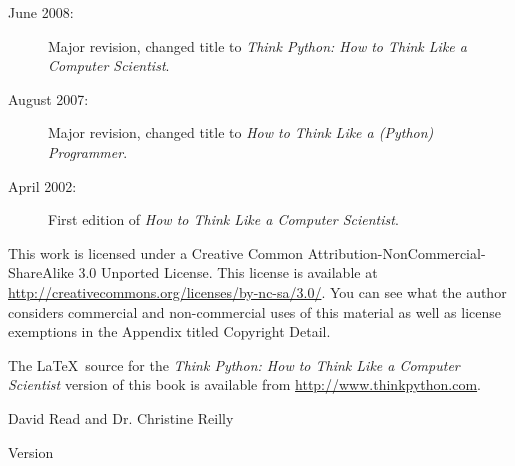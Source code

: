 \begin{latexonly}
{\begin{description}
\item[June 2008:] Major revision, changed title to
\emph{Think Python: How to Think Like
a Computer Scientist}.

\item[August 2007:] Major revision, changed title to
\emph{How to Think Like a (Python) Programmer}.

\item[April 2002:] First edition of \emph{How to Think Like
a Computer Scientist}.

\end{description}

\vspace{0.2in}

This work is licensed under a 
Creative Common
Attribution-NonCommercial-ShareAlike 3.0 Unported License.
This license is 
available at
\url{http://creativecommons.org/licenses/by-nc-sa/3.0/}.  You can 
see what the author considers commercial and non-commercial
uses of this material as well as license exemptions 
in the Appendix titled Copyright Detail.

The \LaTeX\ source for the 
\emph{Think Python: How to Think Like
a Computer Scientist}
version of this book is available from
\url{http://www.thinkpython.com}.

\vspace{0.2in}

} %

\end{latexonly}





{\Large \thetitle}

{\large David Read and Dr. Christine Reilly}

Version \theversion

\setcounter{chapter}{0}


